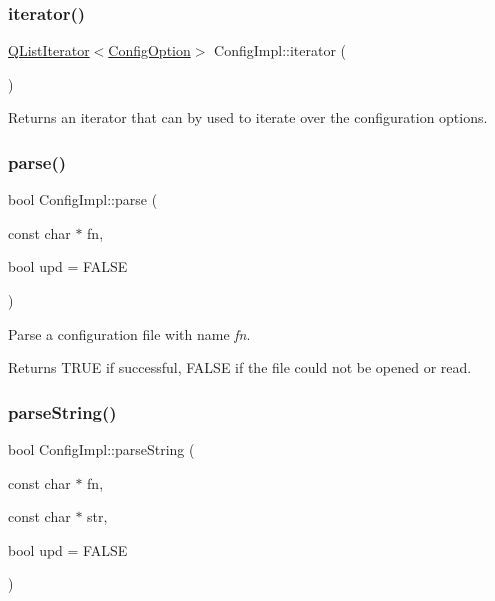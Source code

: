 \subsubsection{\texorpdfstring{iterator()}{iterator()}}
{\footnotesize\ttfamily \mbox{\hyperlink{class_q_list_iterator}{Q\+List\+Iterator}}$<$\mbox{\hyperlink{class_config_option}{Config\+Option}}$>$ Config\+Impl\+::iterator (\begin{DoxyParamCaption}{ }\end{DoxyParamCaption})\hspace{0.3cm}{\ttfamily [inline]}}

Returns an iterator that can by used to iterate over the configuration options. \mbox{\label{class_config_impl_a61cf9409a0055e7fdfe5e065ee2babd2}} 
\subsubsection{\texorpdfstring{parse()}{parse()}}
{\footnotesize\ttfamily bool Config\+Impl\+::parse (\begin{DoxyParamCaption}\item[{const char $\ast$}]{fn,  }\item[{bool}]{upd = {\ttfamily FALSE} }\end{DoxyParamCaption})}

Parse a configuration file with name {\itshape fn}. \begin{DoxyReturn}{Returns}
T\+R\+UE if successful, F\+A\+L\+SE if the file could not be opened or read. 
\end{DoxyReturn}
\mbox{\label{class_config_impl_a7aff48f2feae040678f792416a5197a0}} 
\subsubsection{\texorpdfstring{parseString()}{parseString()}}
{\footnotesize\ttfamily bool Config\+Impl\+::parse\+String (\begin{DoxyParamCaption}\item[{const char $\ast$}]{fn,  }\item[{const char $\ast$}]{str,  }\item[{bool}]{upd = {\ttfamily FALSE} }\end{DoxyParamCaption})}

